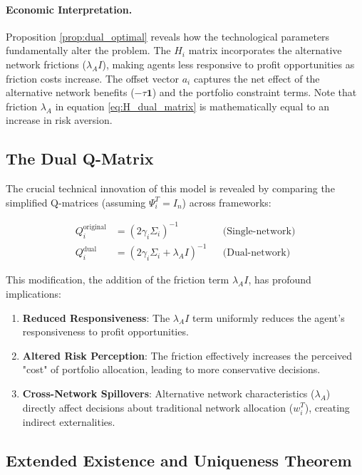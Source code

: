 \paragraph{Economic Interpretation.}
Proposition \ref{prop:dual_optimal} reveals how the technological parameters fundamentally alter the problem. The $H_i$ matrix incorporates the alternative network frictions ($\lambda_A I$), making agents less responsive to profit opportunities as friction costs increase. The offset vector $a_i$ captures the net effect of the alternative network benefits ($-\tau \mathbf{1}$) and the portfolio constraint terms. Note that friction $\lambda_A$ in equation \ref{eq:H_dual_matrix} is mathematically equal to an increase in risk aversion.

\subsection{The Dual Q-Matrix}
\label{sec:dual_q}

The crucial technical innovation of this model is revealed by comparing the simplified Q-matrices (assuming $\Psi_i^T = I_n$) across frameworks:

\begin{align}
Q_i^{\text{original}} &= (2\gamma_i\Sigma_i)^{-1} && \text{(Single-network)} \label{eq:Q_comparison_original} \\
Q_i^{\text{dual}} &= (2\gamma_i\Sigma_i + \lambda_A I)^{-1} && \text{(Dual-network)} \label{eq:Q_comparison_dual}
\end{align}

This modification, the addition of the friction term $\lambda_A I$, has profound implications:

\begin{enumerate}
    \item \textbf{Reduced Responsiveness}: The $\lambda_A I$ term uniformly reduces the agent's responsiveness to profit opportunities.
    \item \textbf{Altered Risk Perception}: The friction effectively increases the perceived "cost" of portfolio allocation, leading to more conservative decisions.
    \item \textbf{Cross-Network Spillovers}: Alternative network characteristics ($\lambda_A$) directly affect decisions about traditional network allocation ($w_i^T$), creating indirect externalities.
\end{enumerate}

\subsection{Extended Existence and Uniqueness Theorem}
\label{sec:existence}

